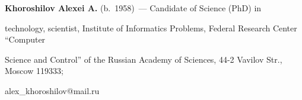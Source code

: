      \textbf{Khoroshilov Alexei A.} (b.\ 1958)~--- Candidate of Science (PhD) in 


technology, scientist, Institute of Informatics Problems, Federal Research Center ``Computer 


Science and Control'' of the Russian Academy of Sciences, 44-2 Vavilov Str., Moscow 119333; 


alex\_khoroshilov@mail.ru


     


\label{end\stat}








\renewcommand{\bibname}{\protect\rm Литература}





        


